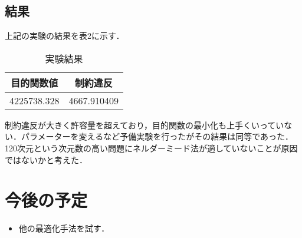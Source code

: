 \documentclass[twocolumn]{jarticle}
\begin{document}
	\subsection{結果}
	上記の実験の結果を表2に示す．
	\begin{table}[htbp]
		\begin{center}
			\caption{実験結果}
			\begin{tabular}{| c | c |} \hline
				目的関数値 & 制約違反 \\ \hline 
				4225738.328 &  4667.910409 \\ \hline
			\end{tabular}
		\end{center}
	\end{table}

	制約違反が大きく許容量を超えており，目的関数の最小化も上手くいっていない．パラメーターを変えるなど予備実験を行ったがその結果は同等であった．120次元という次元数の高い問題にネルダーミード法が適していないことが原因ではないかと考えた．

	
\section{今後の予定}

\begin{itemize}
  \item 他の最適化手法を試す．
\end{itemize}

\end{document}
